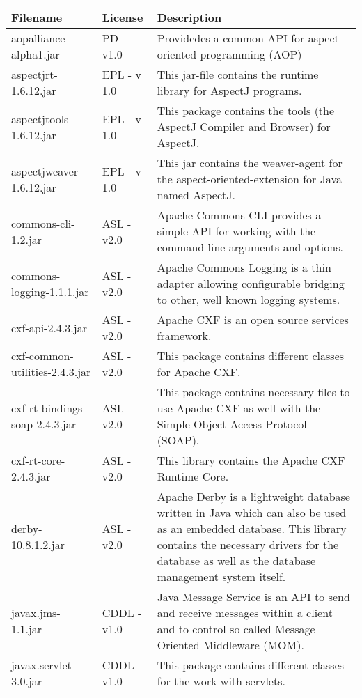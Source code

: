\begin{center}
\begin{longtable}{|p{}|p{}|p{}|}
\hline 
Filename & License & Description\\
\hline
\hline 
aopalliance-alpha1.jar & PD - v1.0 & Providedes a common API for aspect-oriented programming (AOP)\\
\hline 
aspectjrt-1.6.12.jar & EPL - v 1.0 & This jar-file contains the runtime library for AspectJ programs.\\
\hline 
aspectjtools-1.6.12.jar & EPL - v 1.0 & This package contains the tools (the AspectJ Compiler and Browser) for AspectJ.\\
\hline 
aspectjweaver-1.6.12.jar & EPL - v 1.0 & This jar contains the weaver-agent for the aspect-oriented-extension for Java named AspectJ.\\
\hline 
commons-cli-1.2.jar & ASL - v2.0 & Apache Commons CLI provides a simple API for working with the command line arguments and options.\\
\hline 
commons-logging-1.1.1.jar & ASL - v2.0 & Apache Commons Logging is a thin adapter allowing configurable bridging to other, well known logging systems.\\
\hline 
cxf-api-2.4.3.jar & ASL - v2.0 & Apache CXF is an open source services framework.\\
\hline 
cxf-common-utilities-2.4.3.jar & ASL - v2.0 & This package contains different classes for Apache CXF.\\
\hline 
cxf-rt-bindings-soap-2.4.3.jar & ASL - v2.0 & This package contains necessary files to use Apache CXF as well with the Simple Object Access Protocol (SOAP).\\
\hline 
cxf-rt-core-2.4.3.jar & ASL - v2.0 & This library contains the Apache CXF Runtime Core.\\
\hline 
derby-10.8.1.2.jar & ASL - v2.0 & Apache Derby is a lightweight database written in Java which can also be used as an embedded database. This library contains the necessary drivers for the database as well as the database management system itself.\\
\hline 
javax.jms-1.1.jar & CDDL - v1.0 & Java Message Service is an API to send and receive messages within a client and to control so called Message Oriented Middleware (MOM).\\
\hline 
javax.servlet-3.0.jar & CDDL - v1.0 & This package contains different classes for the work with servlets.\\
\hline 

\end{longtable}
\end{center}
